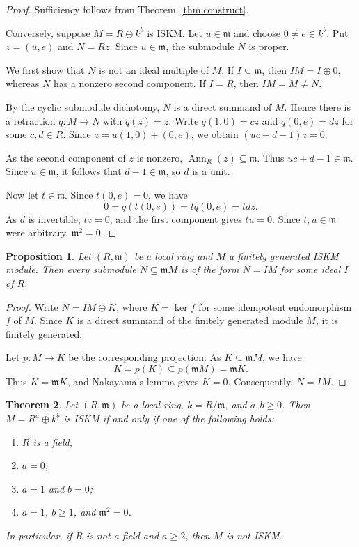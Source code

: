 \documentclass[11pt,a4paper]{article}
\newtheorem{theorem}{Theorem}[section]
\newtheorem{proposition}[theorem]{Proposition}
\theoremstyle{definition}
\theoremstyle{remark}
\begin{document}
\begin{proof}
Sufficiency follows from Theorem~\ref{thm:construct}.

Conversely, suppose $M=R\oplus k^b$ is ISKM. Let $u\in\mathfrak m$ and choose $0\ne e\in k^b$. Put $z=(u,e)$ and $N=Rz$. Since $u\in\mathfrak m$, the submodule $N$ is proper.

We first show that $N$ is not an ideal multiple of $M$. If $I\subseteq\mathfrak m$, then $IM=I\oplus0$, whereas $N$ has a nonzero second component. If $I=R$, then $IM=M\ne N$.

By the cyclic submodule dichotomy, $N$ is a direct summand of $M$. Hence there is a retraction $q:M\to N$ with $q(z)=z$. Write $q(1,0)=cz$ and $q(0,e)=dz$ for some $c,d\in R$. Since $z=u(1,0)+(0,e)$, we obtain $(uc+d-1)z=0$.

As the second component of $z$ is nonzero, $\operatorname{Ann}_R(z)\subseteq\mathfrak m$. Thus $uc+d-1\in\mathfrak m$. Since $u\in\mathfrak m$, it follows that $d-1\in\mathfrak m$, so $d$ is a unit.

Now let $t\in\mathfrak m$. Since $t(0,e)=0$, we have
\[
0=q(t(0,e))=tq(0,e)=tdz.
\]
As $d$ is invertible, $tz=0$, and the first component gives $tu=0$. Since $t,u\in\mathfrak m$ were arbitrary, $\mathfrak m^2=0$.
\end{proof}

\begin{proposition} 
\label{prop:nak}
Let $(R,\mathfrak m)$ be a local ring and $M$ a finitely generated ISKM module. Then every submodule $N\subseteq\mathfrak m M$ is of the form $N=IM$ for some ideal $I$ of $R$.
\end{proposition}

\begin{proof}
Write $N=IM\oplus K$, where $K=\ker f$ for some idempotent endomorphism $f$ of $M$. Since $K$ is a direct summand of the finitely generated module $M$, it is finitely generated.

Let $p:M\to K$ be the corresponding projection. As $K\subseteq\mathfrak m M$, we have
\[
K=p(K)\subseteq p(\mathfrak m M)=\mathfrak m K.
\]
Thus $K=\mathfrak m K$, and Nakayama's lemma gives $K=0$. Consequently, $N=IM$.
\end{proof}

\begin{theorem} 
\label{thm:localiskm}
Let $(R,\mathfrak m)$ be a local ring, $k=R/\mathfrak m$, and $a,b\geq0$. Then $M=R^a\oplus k^b$ is ISKM if and only if one of the following holds:
\begin{enumerate}[label=\textup{(\roman*)}]
\item $R$ is a field;
\item $a=0$;
\item $a=1$ and $b=0$;
\item $a=1$, $b\geq1$, and $\mathfrak m^2=0$.
\end{enumerate}
In particular, if $R$ is not a field and $a\geq2$, then $M$ is not ISKM.
\end{theorem}
\end{document}
